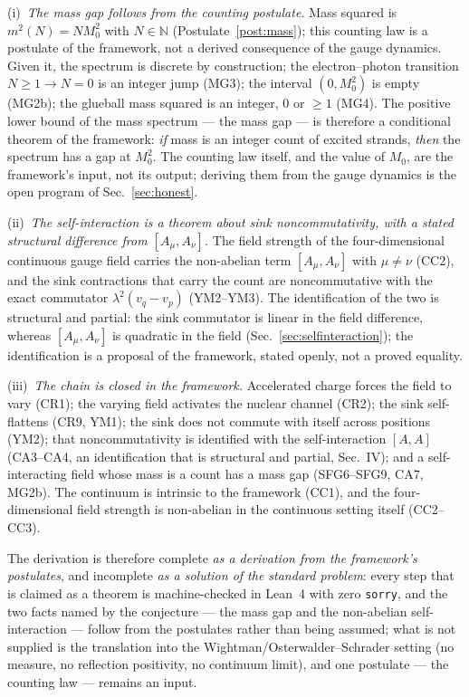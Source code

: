 \documentclass[aps,prd,preprint,superscriptaddress,amsmath,amssymb]{revtex4-2}
\begin{document}
(i)~\emph{The mass gap follows from the counting postulate.}  Mass
squared is $m^2(N)=N M_0^2$ with $N\in\mathbb{N}$
(Postulate~\ref{post:mass}); this counting law is a postulate of the
framework, not a derived consequence of the gauge dynamics.  Given
it, the spectrum is discrete by construction; the electron--photon
transition $N\ge1\to N=0$ is an integer jump (MG3); the interval
$(0,M_0^2)$ is empty (MG2b); the glueball mass squared is an
integer, $0$ or $\ge1$ (MG4).  The positive lower bound of the mass
spectrum --- the mass gap --- is therefore a conditional theorem of
the framework: \emph{if} mass is an integer count of excited strands,
\emph{then} the spectrum has a gap at $M_0^2$.  The counting law
itself, and the value of $M_0$, are the framework's input, not its
output; deriving them from the gauge dynamics is the open program of
Sec.~\ref{sec:honest}.

(ii)~\emph{The self-interaction is a theorem about sink
noncommutativity, with a stated structural difference from
$[A_\mu,A_\nu]$.}  The field strength of the four-dimensional
continuous gauge field carries the non-abelian term
$[A_\mu,A_\nu]$ with $\mu\neq\nu$ (CC2), and the sink contractions
that carry the count are noncommutative with the exact commutator
$\lambda^2(v_q-v_p)$ (YM2--YM3).  The identification of the two is
structural and partial: the sink commutator is linear in the field
difference, whereas $[A_\mu,A_\nu]$ is quadratic in the field
(Sec.~\ref{sec:selfinteraction}); the identification is a proposal
of the framework, stated openly, not a proved equality.

(iii)~\emph{The chain is closed in the framework.}  Accelerated
charge forces the field to vary (CR1); the varying field activates
the nuclear channel (CR2); the sink self-flattens (CR9, YM1); the
sink does not commute with itself across positions (YM2); that
noncommutativity is identified with the self-interaction $[A,A]$
(CA3--CA4, an identification that is structural and partial,
Sec.~IV); and a self-interacting field whose mass is a count has a
mass gap (SFG6--SFG9, CA7, MG2b).  The continuum is intrinsic to the
framework (CC1), and the four-dimensional field strength is
non-abelian in the continuous setting itself (CC2--CC3).

The derivation is therefore complete \emph{as a derivation from the
framework's postulates}, and incomplete \emph{as a solution of the standard
problem}: every step that is claimed as a theorem is machine-checked in
Lean~4 with zero \texttt{sorry}, and the two facts named by the conjecture
--- the mass gap and the non-abelian self-interaction --- follow from the
postulates rather than being assumed; what is not supplied is the
translation into the Wightman/Osterwalder--Schrader setting (no measure, no
reflection positivity, no continuum limit), and one postulate --- the
counting law --- remains an input.
\end{document}
